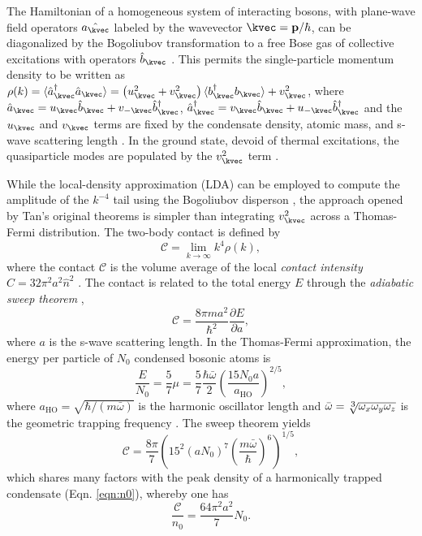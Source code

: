 The Hamiltonian of a homogeneous system of interacting bosons, with plane-wave field operators $\hat{a_\kvec}$ labeled by the wavevector $\kvec=\textbf{p}/\hbar$, can be diagonalized by the Bogoliubov transformation to a free Bose gas of collective excitations with operators $\hat{b}_\kvec$ \cite{Bogolubov47}. This permits the single-particle momentum density to be written as $\rho(k) = \langle\hat{a}_\kvec^\dagger\hat{a}_\kvec\rangle=\left(u_{\kvec}^{2}+v_{\kvec}^{2}\right)\langle b_{\kvec}^{\dagger}b_{\kvec}\rangle + v_{\kvec}^{2}$, where $\hat{a}_\kvec = u_\kvec \hat{b}_\kvec + v_{-\kvec}\hat{b}^\dagger_\kvec$, $\hat{a}^\dagger_\kvec = v_\kvec \hat{b}_\kvec + u_{-\kvec}\hat{b}^\dagger_\kvec$ and the $u_\kvec$ and $v_\kvec$ terms are fixed by the condensate density, atomic mass, and s-wave scattering length \cite{PitaevskiiStringari,PethickSmith}. In the ground state, devoid of thermal excitations, the quasiparticle modes are populated by the $v_{\kvec}^{2}$ term \cite{decamp18,chang16}.

While the local-density approximation (LDA) can be employed to compute the amplitude of the $k^{-4}$ tail using the Bogoliubov disperson \cite{chang16}, the approach opened by Tan's original theorems is simpler than integrating $v_\kvec^2$ across a Thomas-Fermi distribution. The two-body contact is defined by \cite{tan08_momentum}
\begin{equation}
\mathcal{C} = \lim_{k\rightarrow\infty}k^4\rho(k),
\label{eqn:MomentumDef}
\end{equation}
where the contact $\mathcal{C}$ is the volume average of the local \emph{contact intensity} $\hat{C} = 32 \pi^2 a^2 \hat{n}^2$ \cite{werner12_boson}. The contact is related to the total energy $E$ through the \emph{adiabatic sweep theorem} \cite{tan08_energetics},
\begin{equation}
\mathcal{C} = \frac{8\pi m a^2}{\hbar^2}\frac{\partial E}{\partial a},
\end{equation}
where $a$ is the s-wave scattering length. In the Thomas-Fermi approximation, the energy per particle of $N_0$ condensed bosonic atoms is 
\begin{equation}
\frac{E}{N_0} = \frac{5}{7}\mu = \frac{5}{7} \frac{\hbar \bar{\omega}}{2} \left(\frac{15 N_0 a}{a_\textrm{HO}}\right)^{2/5},
\label{mu}
\end{equation}
where $a_\textrm{HO} = \sqrt{\hbar/(m \bar{\omega})}$ is the harmonic oscillator length and $\bar{\omega}=\sqrt[\uproot{2}\scriptstyle 3]{\omega_x \omega_y \omega_z}$ is the geometric trapping frequency \cite{PitaevskiiStringari,PethickSmith}. The sweep theorem yields
\begin{equation}
\mathcal{C} = \frac{8\pi}{7} \left(15^{2}(a N_0)^{7} \left(\frac{m \bar{\omega}}{\hbar}\right)^{6}\right)^{1/5},
\label{eqn:TotalHarmonicContact}
\end{equation}
which shares many factors with the peak density of a harmonically trapped condensate (Eqn. \ref{eqn:n0}), whereby one has
\begin{equation}
	\frac{\mathcal{C}}{n_0} = \frac{64\pi^2a^2}{7} N_0.
\end{equation}


